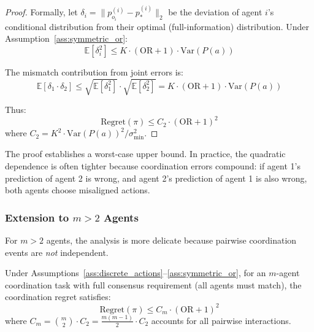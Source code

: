 \begin{proof}
Formally, let $\delta_i = \|p^{(i)}_{o_i} - p^{(i)}_*\|_2$ be the deviation of agent $i$'s conditional distribution from their optimal (full-information) distribution. Under Assumption~\ref{ass:symmetric_or}:
\begin{equation}
\mathbb{E}[\delta_i^2] \leq K \cdot (\text{OR} + 1) \cdot \text{Var}(P(a))
\end{equation}

The mismatch contribution from joint errors is:
\begin{equation}
\mathbb{E}[\delta_1 \cdot \delta_2] \leq \sqrt{\mathbb{E}[\delta_1^2]} \cdot \sqrt{\mathbb{E}[\delta_2^2]} = K \cdot (\text{OR} + 1) \cdot \text{Var}(P(a))
\end{equation}

Thus:
\begin{equation}
\text{Regret}(\pi) \leq C_2 \cdot (\text{OR} + 1)^2
\end{equation}
where $C_2 = K^2 \cdot \text{Var}(P(a))^2 / \sigma^2_{\min}$.
\end{proof}

\begin{remark}
The proof establishes a worst-case upper bound. In practice, the quadratic dependence is often tighter because coordination errors compound: if agent 1's prediction of agent 2 is wrong, and agent 2's prediction of agent 1 is also wrong, both agents choose misaligned actions.
\end{remark}

\subsubsection{Extension to $m > 2$ Agents}

For $m > 2$ agents, the analysis is more delicate because pairwise coordination events are \textit{not} independent.

\begin{theorem}
\label{thm:quadratic_general}
Under Assumptions~\ref{ass:discrete_actions}--\ref{ass:symmetric_or}, for an $m$-agent coordination task with full consensus requirement (all agents must match), the coordination regret satisfies:
\begin{equation}
\text{Regret}(\pi) \leq C_m \cdot (\text{OR} + 1)^2
\end{equation}
where $C_m = \binom{m}{2} \cdot C_2 = \frac{m(m-1)}{2} \cdot C_2$ accounts for all pairwise interactions.
\end{theorem}

